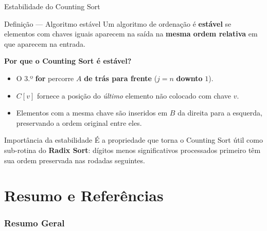 \documentclass[aspectratio=169]{beamer}
\begin{document}
\begin{frame}[shrink]{Estabilidade do Counting Sort}
  \begin{block}{Definição — Algoritmo estável}
    Um algoritmo de ordenação é \textbf{estável} se elementos com chaves iguais
    aparecem na saída na \textbf{mesma ordem relativa} em que aparecem na entrada.
  \end{block}

  \vspace{0.3cm}
  \textbf{Por que o Counting Sort é estável?}
  \begin{itemize}
    \item O 3.º \textbf{for} percorre $A$ \textbf{de trás para frente} ($j = n$ \textbf{downto} $1$).
    \item $C[v]$ fornece a posição do \emph{último} elemento não colocado com chave $v$.
    \item Elementos com a mesma chave são inseridos em $B$ da direita para a esquerda,
             preservando a ordem original entre eles.
  \end{itemize}

  \vspace{0.2cm}
  \begin{alertblock}{Importância da estabilidade}
    É a propriedade que torna o Counting Sort útil como sub-rotina do
    \textbf{Radix Sort}: dígitos menos significativos processados primeiro
    têm sua ordem preservada nas rodadas seguintes.
  \end{alertblock}
\end{frame}

\part{Resumo e Referências}
\section{Resumo Geral}
\end{document}
